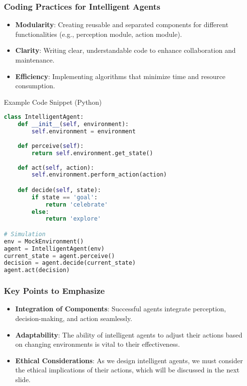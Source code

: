 \documentclass[aspectratio=169]{beamer}
\begin{document}
\begin{frame}[fragile]
    \frametitle{Coding Practices for Intelligent Agents}
    \begin{itemize}
        \item \textbf{Modularity}: Creating reusable and separated components for different functionalities (e.g., perception module, action module).
        \item \textbf{Clarity}: Writing clear, understandable code to enhance collaboration and maintenance.
        \item \textbf{Efficiency}: Implementing algorithms that minimize time and resource consumption.
    \end{itemize}
    
    \begin{block}{Example Code Snippet (Python)}
    \begin{lstlisting}[language=Python]
class IntelligentAgent:
    def __init__(self, environment):
        self.environment = environment
    
    def perceive(self):
        return self.environment.get_state()
    
    def act(self, action):
        self.environment.perform_action(action)

    def decide(self, state):
        if state == 'goal':
            return 'celebrate'
        else:
            return 'explore'

# Simulation
env = MockEnvironment()
agent = IntelligentAgent(env)
current_state = agent.perceive()
decision = agent.decide(current_state)
agent.act(decision)
    \end{lstlisting}
    \end{block}
\end{frame}

\begin{frame}
    \frametitle{Key Points to Emphasize}
    \begin{itemize}
        \item \textbf{Integration of Components}: Successful agents integrate perception, decision-making, and action seamlessly.
        \item \textbf{Adaptability}: The ability of intelligent agents to adjust their actions based on changing environments is vital to their effectiveness.
        \item \textbf{Ethical Considerations}: As we design intelligent agents, we must consider the ethical implications of their actions, which will be discussed in the next slide.
    \end{itemize}
\end{frame}
\end{document}
